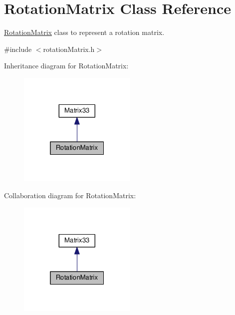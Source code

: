 \hypertarget{classRotationMatrix}{\section{Rotation\-Matrix Class Reference}
\label{d2/d4a/classRotationMatrix}
}


\hyperlink{classRotationMatrix}{Rotation\-Matrix} class to represent a rotation matrix.  




{\ttfamily \#include $<$rotation\-Matrix.\-h$>$}



Inheritance diagram for Rotation\-Matrix\-:\nopagebreak
\begin{figure}[H]
\begin{center}
\leavevmode
\includegraphics[width=160pt]{d5/d4d/classRotationMatrix__inherit__graph}
\end{center}
\end{figure}


Collaboration diagram for Rotation\-Matrix\-:\nopagebreak
\begin{figure}[H]
\begin{center}
\leavevmode
\includegraphics[width=160pt]{d5/dc0/classRotationMatrix__coll__graph}
\end{center}
\end{figure}
